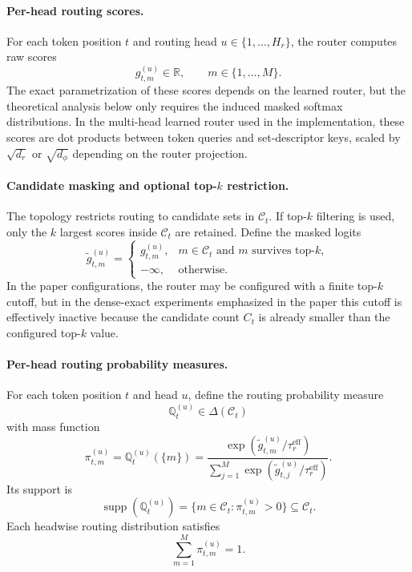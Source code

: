 \documentclass{article}
\theoremstyle{plain}
\theoremstyle{definition}
\theoremstyle{remark}
\begin{document}
\paragraph{Per-head routing scores.}
For each token position $t$ and routing head $u\in\{1,\dots,H_r\}$, the router computes raw scores
\begin{equation}
\label{eq:routing-scores}
g^{(u)}_{t,m}\in\mathbb R,
\qquad m\in\{1,\dots,M\}.
\end{equation}
The exact parametrization of these scores depends on the learned router, but the
theoretical analysis below only requires the induced masked softmax
distributions. In the multi-head learned router used in the implementation,
these scores are dot products between token queries and set-descriptor keys,
scaled by $\sqrt{d_r}$ or $\sqrt{d_\phi}$ depending on the router projection.

\paragraph{Candidate masking and optional top-$k$ restriction.}
The topology restricts routing to candidate sets in $\mathcal C_t$. If top-$k$ filtering is used, only the $k$ largest scores inside $\mathcal C_t$ are retained. Define the masked logits
\begin{equation}
\label{eq:masked-logits}
\widetilde g^{(u)}_{t,m}=
\begin{cases}
g^{(u)}_{t,m},& m\in\mathcal C_t \text{ and } m \text{ survives top-}k,\\
-\infty,& \text{otherwise}.
\end{cases}
\end{equation}
In the paper configurations, the router may be configured with a finite
top-$k$ cutoff, but in the dense-exact experiments emphasized in the paper this
cutoff is effectively inactive because the candidate count $C_t$ is already
smaller than the configured top-$k$ value.

\paragraph{Per-head routing probability measures.}
For each token position $t$ and head $u$, define the routing probability measure
\begin{equation}
\label{eq:routing-probability-measure}
\mathbb Q_t^{(u)}\in\Delta(\mathcal C_t)
\end{equation}
with mass function
\begin{equation}
\label{eq:routing-probabilities}
\pi_{t,m}^{(u)}=\mathbb Q_t^{(u)}(\{m\})
=
\frac{\exp(\widetilde g^{(u)}_{t,m}/\tau_r^{\mathrm{eff}})}{\sum_{j=1}^M \exp(\widetilde g^{(u)}_{t,j}/\tau_r^{\mathrm{eff}})}.
\end{equation}
Its support is
\begin{equation}
\label{eq:routing-support}
\operatorname{supp}(\mathbb Q_t^{(u)})
=
\{m\in\mathcal C_t: \pi_{t,m}^{(u)}>0\}
\subseteq \mathcal C_t.
\end{equation}
Each headwise routing distribution satisfies
\begin{equation}
\label{eq:routing-prob-sum}
\sum_{m=1}^M \pi_{t,m}^{(u)}=1.
\end{equation}
\end{document}
